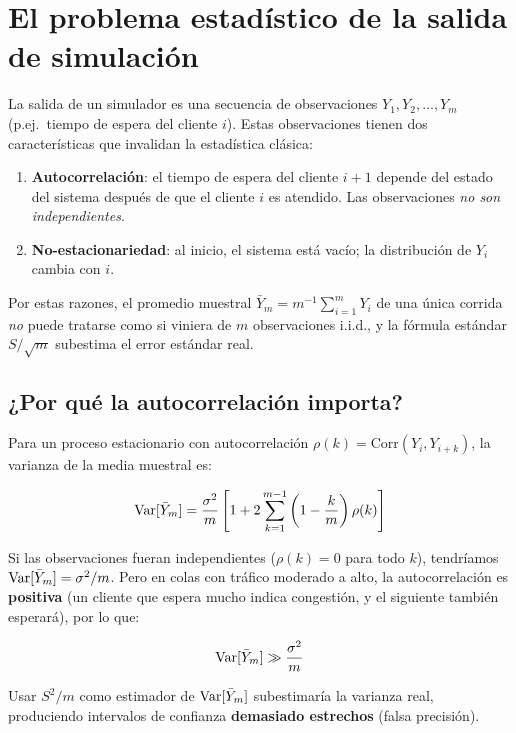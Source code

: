 \documentclass[11pt, letterpaper]{article}
\begin{document}
\section{El problema estadístico de la salida de simulación}

La salida de un simulador es una secuencia de observaciones $Y_1, Y_2, \ldots, Y_m$ (p.ej.\ tiempo de espera del cliente $i$). Estas observaciones tienen dos características que invalidan la estadística clásica:

\begin{enumerate}
    \item \textbf{Autocorrelación}: el tiempo de espera del cliente $i+1$ depende del estado del sistema después de que el cliente $i$ es atendido. Las observaciones \emph{no son independientes}.
    \item \textbf{No-estacionariedad}: al inicio, el sistema está vacío; la distribución de $Y_i$ cambia con $i$.
\end{enumerate}

Por estas razones, el promedio muestral $\bar Y_m = m^{-1}\sum_{i=1}^m Y_i$ de una única corrida \emph{no} puede tratarse como si viniera de $m$ observaciones i.i.d., y la fórmula estándar $S/\sqrt{m}$ subestima el error estándar real.

\subsection{¿Por qué la autocorrelación importa?}

Para un proceso estacionario con autocorrelación $\rho(k) = \text{Corr}(Y_i, Y_{i+k})$, la varianza de la media muestral es:

\[
\operatorname{Var}[\bar Y_m] = \frac{\sigma^2}{m}\left[1 + 2\sum_{k=1}^{m-1}\left(1-\frac{k}{m}\right)\rho(k)\right]
\]

Si las observaciones fueran independientes ($\rho(k)=0$ para todo $k$), tendríamos $\operatorname{Var}[\bar Y_m] = \sigma^2/m$. Pero en colas con tráfico moderado a alto, la autocorrelación es \textbf{positiva} (un cliente que espera mucho indica congestión, y el siguiente también esperará), por lo que:

\[
\operatorname{Var}[\bar Y_m] \gg \frac{\sigma^2}{m}
\]

Usar $S^2/m$ como estimador de $\operatorname{Var}[\bar Y_m]$ subestimaría la varianza real, produciendo intervalos de confianza \textbf{demasiado estrechos} (falsa precisión).
\end{document}
